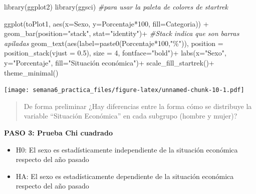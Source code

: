 \documentclass[
]{article}
\newenvironment{Shaded}{\begin{snugshade}}{\end{snugshade}}
\newcommand{\AttributeTok}[1]{\textcolor[rgb]{0.77,0.63,0.00}{#1}}
\newcommand{\CommentTok}[1]{\textcolor[rgb]{0.56,0.35,0.01}{\textit{#1}}}
\newcommand{\DecValTok}[1]{\textcolor[rgb]{0.00,0.00,0.81}{#1}}
\newcommand{\FloatTok}[1]{\textcolor[rgb]{0.00,0.00,0.81}{#1}}
\newcommand{\FunctionTok}[1]{\textcolor[rgb]{0.00,0.00,0.00}{#1}}
\newcommand{\NormalTok}[1]{#1}
\newcommand{\SpecialCharTok}[1]{\textcolor[rgb]{0.00,0.00,0.00}{#1}}
\newcommand{\StringTok}[1]{\textcolor[rgb]{0.31,0.60,0.02}{#1}}
\begin{document}
\begin{Shaded}
\begin{Highlighting}[]
\FunctionTok{library}\NormalTok{(ggplot2)}
\FunctionTok{library}\NormalTok{(ggsci) }\CommentTok{\#para usar la paleta de colores de startrek}

  \FunctionTok{ggplot}\NormalTok{(toPlot1, }\FunctionTok{aes}\NormalTok{(}\AttributeTok{x=}\NormalTok{Sexo, }\AttributeTok{y=}\NormalTok{Porcentaje}\SpecialCharTok{*}\DecValTok{100}\NormalTok{, }\AttributeTok{fill=}\NormalTok{Categoria)) }\SpecialCharTok{+}
  \FunctionTok{geom\_bar}\NormalTok{(}\AttributeTok{position=}\StringTok{"stack"}\NormalTok{, }\AttributeTok{stat=}\StringTok{"identity"}\NormalTok{)}\SpecialCharTok{+} \CommentTok{\#Stack indica que son barras apiladas}
  \FunctionTok{geom\_text}\NormalTok{(}\FunctionTok{aes}\NormalTok{(}\AttributeTok{label=}\FunctionTok{paste0}\NormalTok{(Porcentaje}\SpecialCharTok{*}\DecValTok{100}\NormalTok{,}\StringTok{"\%"}\NormalTok{)), }
            \AttributeTok{position =} \FunctionTok{position\_stack}\NormalTok{(}\AttributeTok{vjust =} \FloatTok{0.5}\NormalTok{), }
             \AttributeTok{size =} \DecValTok{4}\NormalTok{,}
             \AttributeTok{fontface=}\StringTok{"bold"}\NormalTok{)}\SpecialCharTok{+}
  \FunctionTok{labs}\NormalTok{(}\AttributeTok{x=}\StringTok{"Sexo"}\NormalTok{, }\AttributeTok{y=}\StringTok{"Porcentaje"}\NormalTok{, }\AttributeTok{fill=}\StringTok{"Situación económica"}\NormalTok{)}\SpecialCharTok{+}
    \FunctionTok{scale\_fill\_startrek}\NormalTok{()}\SpecialCharTok{+}
  \FunctionTok{theme\_minimal}\NormalTok{()}
\end{Highlighting}
\end{Shaded}

\texttt{[image: semana6\_practica\_files/figure-latex/unnamed-chunk-10-1.pdf]}

\begin{quote}
De forma preliminar ¿Hay diferencias entre la forma cómo se distribuye
la variable ``Situación Económica'' en cada subgrupo (hombre y mujer)?
\end{quote}

\textbf{PASO 3: Prueba Chi cuadrado}

\begin{itemize}
\item
  H0: El sexo es estadísticamente independiente de la situación
  económica respecto del año pasado
\item
  HA: El sexo es estadísticamente dependiente de la situación económica
  respecto del año pasado
\end{itemize}
\end{document}
